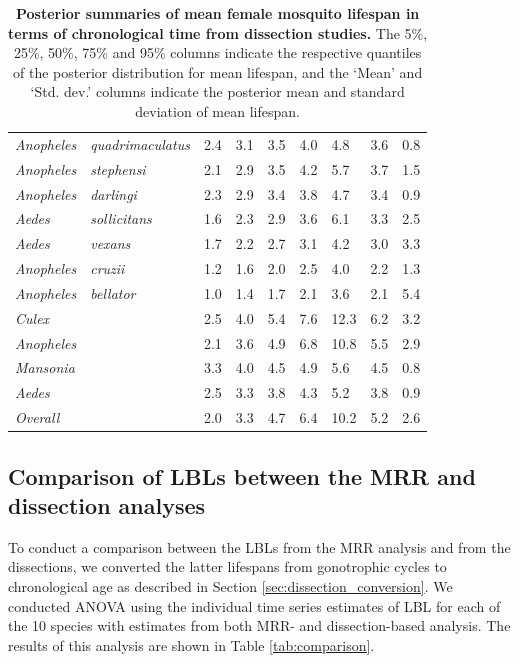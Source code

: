 \documentclass[12pt]{article}
\begin{document}
\begin{table}[htbp!]
\begin{tabular}{l|l|l|l|l|l|l|l|l}
	\textit{Anopheles} & \textit{quadrimaculatus} & 2.4 & 3.1 & 3.5 & 4.0 & 4.8 & 3.6 & 0.8 \\
	\textit{Anopheles} & \textit{stephensi} & 2.1 & 2.9 & 3.5 & 4.2 & 5.7 & 3.7 & 1.5 \\
	\textit{Anopheles} & \textit{darlingi} & 2.3 & 2.9 & 3.4 & 3.8 & 4.7 & 3.4 & 0.9 \\
	\textit{Aedes} & \textit{sollicitans} & 1.6 & 2.3 & 2.9 & 3.6 & 6.1 & 3.3 & 2.5 \\
	\textit{Aedes} & \textit{vexans} & 1.7 & 2.2 & 2.7 & 3.1 & 4.2 & 3.0 & 3.3 \\
	\textit{Anopheles} & \textit{cruzii} & 1.2 & 1.6 & 2.0 & 2.5 & 4.0 & 2.2 & 1.3 \\
	\textit{Anopheles} & \textit{bellator} & 1.0 & 1.4 & 1.7 & 2.1 & 3.6 & 2.1 & 5.4 \\
		\hline
		\textit{Culex} & \textit{} & 2.5 & 4.0 & 5.4 & 7.6 & 12.3 & 6.2 & 3.2 \\
		\textit{Anopheles} & \textit{} & 2.1 & 3.6 & 4.9 & 6.8 & 10.8 & 5.5 & 2.9 \\
		\textit{Mansonia} & \textit{} & 3.3 & 4.0 & 4.5 & 4.9 & 5.6 & 4.5 & 0.8 \\
		\textit{Aedes} & \textit{} & 2.5 & 3.3 & 3.8 & 4.3 & 5.2 & 3.8 & 0.9 \\
		\hline
		\textit{Overall} & \textit{} & 2.0 & 3.3 & 4.7 & 6.4 & 10.2 & 5.2 & 2.6 \\
	\end{tabular}
	\caption{\textbf{Posterior summaries of mean female mosquito lifespan in terms of chronological time from dissection studies.} The 5\%, 25\%, 50\%, 75\% and 95\% columns indicate the respective quantiles of the posterior distribution for mean lifespan, and the `Mean' and `Std. dev.' columns indicate the posterior mean and standard deviation of mean lifespan.}
	\label{tab:dissection_estimated_lifespans_chron}%
\end{table}

\subsection{Comparison of LBLs between the MRR and dissection analyses}
To conduct a comparison between the LBLs from the MRR analysis and from the dissections, we converted the latter lifespans from gonotrophic cycles to chronological age as described in Section \ref{sec:dissection_conversion}. We conducted ANOVA using the individual time series estimates of LBL for each of the 10 species with estimates from both MRR- and dissection-based analysis. The results of this analysis are shown in Table \ref{tab:comparison}.
\end{document}
